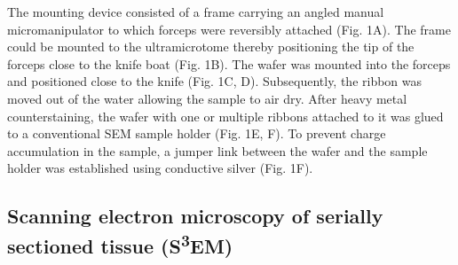 \documentclass{article}
\begin{document}
The mounting device consisted of a frame carrying an angled manual micromanipulator to which forceps were reversibly attached (Fig. 1A). The frame could be mounted to the ultramicrotome thereby positioning the tip of the forceps close to the knife boat (Fig. 1B). The wafer was mounted into the forceps and positioned close to the knife (Fig. 1C, D). Subsequently, the ribbon was moved out of the water allowing the sample to air dry. After heavy metal counterstaining, the wafer with one or multiple ribbons attached to it was glued to a conventional SEM sample holder (Fig. 1E, F). To prevent charge accumulation in the sample, a jumper link between the wafer and the sample holder was established using conductive silver (Fig. 1F).

\subsection*{Scanning electron microscopy of serially sectioned tissue (S\textsuperscript{3}EM)}
\end{document}
